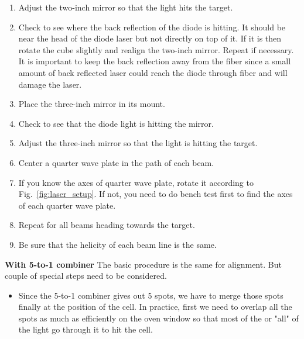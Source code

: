 {\begin{enumerate}
\begin{itemize}
\item Rotate the quarter wave plate forty-five degrees.
\end{itemize}
\item Adjust the two-inch mirror so that the light hits the target.
\item Check to see where the back reflection of the diode is hitting. It
  should be near the head of the diode laser but not directly on top of
  it. If it is then rotate the cube slightly and realign the two-inch
  mirror. Repeat if necessary.  It is important to keep the back reflection
  away from the fiber since a small amount of back reflected laser could reach 
  the diode through fiber and will damage the laser.
\item Place the three-inch mirror in its mount.
\item Check to see that the diode light is hitting the mirror.
\item Adjust the three-inch mirror so that the light is hitting the
  target.
\item Center a quarter wave plate in the path of each beam.
\item If you know the axes of quarter wave plate, rotate it according to 
      Fig.~\ref{fig:laser_setup}.  If not, you need to do bench test first to 
      find the axes of each quarter wave plate.
\item Repeat for all beams heading towards the target.
\item Be sure that the helicity of each beam line is the same.
\end{enumerate}

\medskip
\noindent
{\bf{With 5-to-1 combiner}}
The basic procedure is the same for alignment. But couple of special
steps need to be considered.

\begin{itemize}
\item Since the 5-to-1 combiner gives out 5 spots, we have to merge those
spots finally at the position of the cell. In practice, first we need to
overlap all the spots as much as efficiently on the oven window so that
most of the or "all" of the light go through it to hit the cell.


\end{itemize}}
